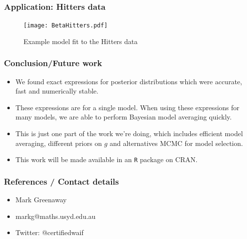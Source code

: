 \documentclass{beamer}
\begin{document}
\begin{frame}
	\frametitle{Application: Hitters data}
	\begin{figure}
		\caption{Example model fit to the Hitters data}
		\texttt{[image: BetaHitters.pdf]}
	\end{figure}
\end{frame}


\begin{frame}
	\frametitle{Conclusion/Future work}
	\begin{itemize}
		\item We found exact expressions for posterior distributions which were accurate, fast and numerically
					stable.
		\item These expressions are for a single model. When using these expressions for many models, we are able
					to perform Bayesian model averaging quickly.
		\item This is just one part of the work we're doing, which includes efficient model averaging, different
					priors on $g$ and alternatives MCMC for model selection.
		\item This work will be made available in an \texttt{R} package on CRAN.
	\end{itemize}

\end{frame}

\begin{frame}
	\frametitle{References / Contact details}
	\begin{itemize}
		\item Mark Greenaway
		\item markg@maths.usyd.edu.au
		\item Twitter: @certifiedwaif	
	\end{itemize}

	\small
	
	
\end{frame}

\end{document}
